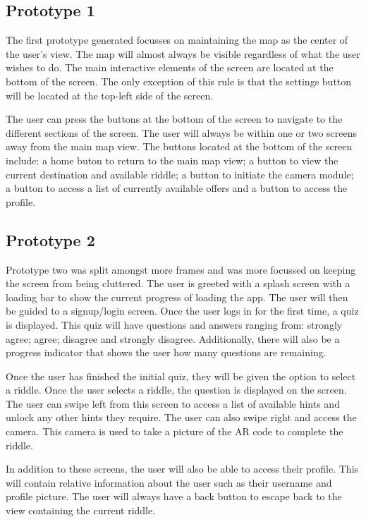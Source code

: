 \documentclass[10pt,twocolumn]{article} %
\begin{document}
\subsection*{Prototype 1}
The first prototype generated focusses on maintaining the map as the center of the user's view. The map will almost always be visible regardless of what the user wishes to do. The main interactive elements of the screen are located at the bottom of the screen. The only exception of this rule is that the settings button will be located at the top-left side of the screen.

The user can press the buttons at the bottom of the screen to navigate to the different sections of the screen. The user will always be within one or two screens away from the main map view. The buttons located at the bottom of the screen include: a home buton to return to the main map view; a button to view the current destination and available riddle; a button to initiate the camera module; a button to access a list of currently available offers and a button to access the profile.

\subsection*{Prototype 2}
Prototype two was split amongst more frames and was more focussed on keeping the screen from being cluttered. The user is greeted with a splash screen with a loading bar to show the current progress of loading the app. The user will then be guided to a signup/login screen. Once the user logs in for the first time, a quiz is displayed. This quiz will have questions and answers ranging from: strongly agree; agree; disagree and strongly disagree. Additionally, there will also be a progress indicator that shows the user how many questions are remaining. 

Once the user has finished the initial quiz, they will be given the option to select a riddle. Once the user selects a riddle, the question is displayed on the screen. The user can swipe left from this screen to access a list of available hints and unlock any other hints they require. The user can also swipe right and access the camera. This camera is used to take a picture of the AR code to complete the riddle. 

In addition to these screens, the user will also be able to access their profile. This will contain relative information about the user such as their username and profile picture. The user will always have a back button to escape back to the view containing the current riddle.
\end{document}
